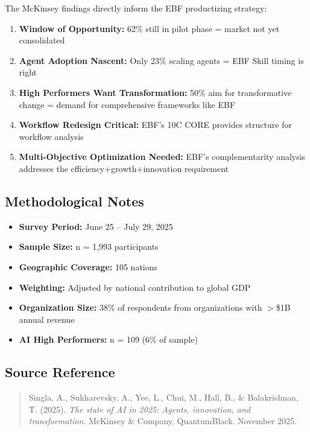 The McKinsey findings directly inform the EBF productizing strategy:

\begin{enumerate}
\item \textbf{Window of Opportunity:} 62\% still in pilot phase = market not yet consolidated
\item \textbf{Agent Adoption Nascent:} Only 23\% scaling agents = EBF Skill timing is right
\item \textbf{High Performers Want Transformation:} 50\% aim for transformative change = demand for comprehensive frameworks like EBF
\item \textbf{Workflow Redesign Critical:} EBF's 10C CORE provides structure for workflow analysis
\item \textbf{Multi-Objective Optimization Needed:} EBF's complementarity analysis addresses the efficiency+growth+innovation requirement
\end{enumerate}


\subsection{Methodological Notes}

\begin{itemize}
\item \textbf{Survey Period:} June 25 -- July 29, 2025
\item \textbf{Sample Size:} n = 1,993 participants
\item \textbf{Geographic Coverage:} 105 nations
\item \textbf{Weighting:} Adjusted by national contribution to global GDP
\item \textbf{Organization Size:} 38\% of respondents from organizations with $>$\$1B annual revenue
\item \textbf{AI High Performers:} n = 109 (6\% of sample)
\end{itemize}


\subsection{Source Reference}

\begin{quote}
Singla, A., Sukharevsky, A., Yee, L., Chui, M., Hall, B., \& Balakrishnan, T. (2025). \textit{The state of AI in 2025: Agents, innovation, and transformation}. McKinsey \& Company, QuantumBlack. November 2025.
\end{quote}

